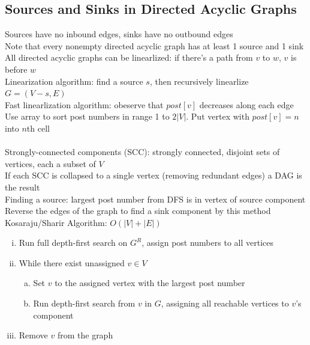 \documentclass{article}
\begin{document}
		\subsection{Sources and Sinks in Directed Acyclic Graphs}
			Sources have no inbound edges, sinks have no outbound edges \\
			Note that every nonempty directed acyclic graph has at least 1 source and 1 sink \\
			All directed acyclic graphs can be linearlized: if there's a path from $v$ to $w$, $v$ is before $w$ \\
			Linearization algorithm: find a source $s$, then recursively linearlize $G = (V - s, E)$ \\
			Fast linearlization algorithm: obeserve that $post[v]$ decreases along each edge \\
			Use array to sort post numbers in range 1 to $2|V|$. Put vertex with $post[v] = n$ into $n$th cell \\
			\\
			Strongly-connected components (SCC): strongly connected, disjoint sets of vertices, each a subset of $V$ \\
			If each SCC is collapsed to a single vertex (removing redundant edges) a DAG is the result \\
			Finding a source: largest post number from DFS is in vertex of source component \\
			Reverse the edges of the graph to find a sink component by this method \\
			Kosaraju/Sharir Algorithm: $O(|V| + |E|)$
			\begin{enumerate}[(i)]
				\item Run full depth-first search on $G^R$, assign post numbers to all vertices
				\item While there exist unassigned $v \in V$
				\begin{enumerate}[(a)]
					\item Set $v$ to the assigned vertex with the largest post number
					\item Run depth-first search from $v$ in $G$, assigning all reachable vertices to $v$'s component
					\end{enumerate}
					\item Remove $v$ from the graph
				\end{enumerate}
\end{document}

